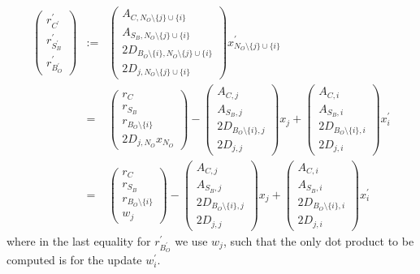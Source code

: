 \documentclass[a4paper]{article}
\begin{document}
\begin{eqnarray}
\left(
\begin{array}{c}
r_{C^{\prime}}^{\prime} \\
\hline
r_{S_{B}^{\prime}}^{\prime} \\
\hline
r_{B_{O}^{\prime}}^{\prime}
\end{array}
\right)
&:=&
\left(
\begin{array}{c}
A_{C, N_{O} \setminus\{j\} \cup \{i\}} \\
\hline
A_{S_{B}, N_{O} \setminus\{j\} \cup \{i\}} \\
\hline
2D_{B_{O} \setminus \{i\}, N_{O} \setminus\{j\} \cup \{i\}} \\
\hline
2D_{j, N_{O} \setminus\{j\} \cup \{i\}}
\end{array}
\right)
x_{N_{O} \setminus\{j\} \cup \{i\}}^{\prime}
\nonumber \\
&=&
\left(
\begin{array}{c}
r_{C} \\
\hline
r_{S_{B}} \\
\hline
r_{B_{O} \setminus \{i\}} \\
\hline
2D_{j, N_{O}}x_{N_{O}}
\end{array}
\right)
-
\left(
\begin{array}{c}
A_{C, j} \\
\hline
A_{S_{B}, j} \\
\hline
2D_{B_{O} \setminus \{i\}, j} \\
\hline
2D_{j, j}
\end{array}
\right)
x_{j}
+
\left(
\begin{array}{c}
A_{C, i} \\
\hline
A_{S_{B}, i} \\
\hline
2D_{B_{O} \setminus \{i\}, i} \\
\hline
2D_{j,i}
\end{array}
\right)
x_{i}^{\prime}
\nonumber \\
&=&
\left(
\begin{array}{c}
r_{C} \\
\hline
r_{S_{B}} \\
\hline
r_{B_{O} \setminus \{i\}} \\
\hline
w_{j}
\end{array}
\right)
-
\left(
\begin{array}{c}
A_{C, j} \\
\hline
A_{S_{B}, j} \\
\hline
2D_{B_{O} \setminus \{i\}, j} \\
\hline
2D_{j, j}
\end{array}
\right)
x_{j}
+
\left(
\begin{array}{c}
A_{C, i} \\
\hline
A_{S_{B}, i} \\
\hline
2D_{B_{O} \setminus \{i\}, i} \\
\hline
2D_{j,i}
\end{array}
\right)
x_{i}^{\prime}
\end{eqnarray}
where in the last equality for $r_{B_{O}^{\prime}}^{\prime}$ we use $w_{j}$,
such that the only dot product to be computed is for the update
$w_{i}^{\prime}$.
\end{document}
